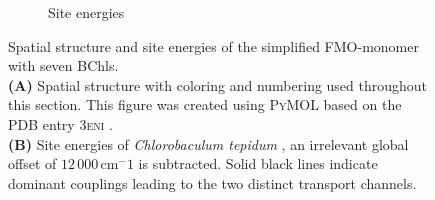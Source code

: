 \begin{figure}[t]
\begin{subfigure}[t]{0.4\columnwidth}
    \caption{%
      Site energies
    }
    \label{fig:app.site_energies}
  \end{subfigure}
  \caption{%
      Spatial structure and site energies of the simplified FMO-monomer with seven BChls.\\
      \textbf{(A)} Spatial structure with coloring and numbering used throughout this section.
      This figure was created using \textsc{PyMOL} based on the \textsc{PDB} entry \textsc{3eni} \cite{pymol,TrCaBl09_fmo_structure}.\\
      \textbf{(B)} Site energies of \emph{Chlorobaculum tepidum} \cite{AdRe06_fmo}, an irrelevant global offset of $12\,000\,\mathrm{cm^-1}$ is subtracted.
      Solid black lines indicate dominant couplings leading to the two distinct transport channels.
  }
\end{figure}


